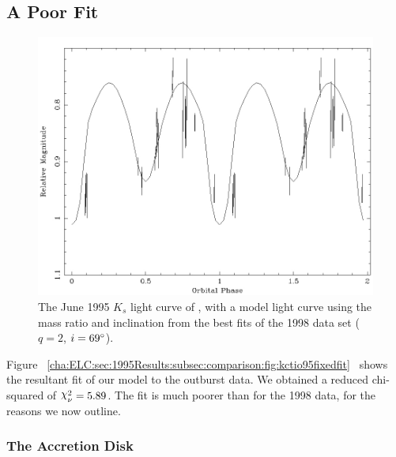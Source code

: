 
\subsection{A Poor Fit}
\label{cha:ELC:sec:1995Results:subsec:comparison}

\begin{figure}[!htb]
\begin{center}
\includegraphics[width=5.0in]{kctio95fixedfit}
\caption{%
The June 1995 $K_s$ light curve of \groj, with a model
light curve using the mass ratio and inclination from the best fits of
the 1998 data set ($q=2$, $i=69\hbox{$^\circ$}$). %
}
\label{cha:ELC:sec:1995Results:subsec:comparison:fig:kctio95fixedfit}
\end{center}
\end{figure}

Figure~%
\vref{cha:ELC:sec:1995Results:subsec:comparison:fig:kctio95fixedfit}%
\ shows the resultant fit of our model to the outburst data. We
obtained a reduced chi-squared of $\Chi_{\nu}^{2} = 5.89$. The fit is much poorer than for the 1998 data, for the reasons we now outline. %


\subsubsection{The Accretion Disk}
\label{cha:ELC:sec:1995Results:subsec:comparison:subsubsec:disk}

